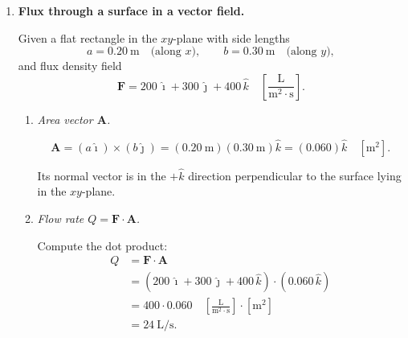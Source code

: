 \documentclass[12pt]{article}
\begin{document}
\begin{enumerate}
\begin{enumerate}
    \item \textit{Projection of $\mathbf{a}$ onto $\mathbf{v}$. Physical meaning.}

    The projection of $\mathbf{a}$ onto $\mathbf{v}$ is the component of acceleration along the direction of motion. It measures tangential acceleration (change in speed). Compute
    \[
      \text{proj}_{\mathbf{v}}\mathbf{a}
      = \frac{\mathbf{a}\cdot \mathbf{v}}{\|\mathbf{v}\|^2} \,\mathbf{v}.
    \]

    First compute the dot product:
    \begin{align*}
      \mathbf{a}(t)\cdot \mathbf{v}(t)
      &= (-a\cos t)(-a\sin t) + (-a\sin t)(a\cos t) + (0)(c) \\
      &= a^2 \cos t \sin t - a^2 \sin t \cos t \\
      &= 0.
    \end{align*}

    Therefore
    \[
      \text{proj}_{\mathbf{v}}\mathbf{a} = \mathbf{0}.
    \]

    Interpretation: there is no acceleration component along the velocity direction, so the speed is constant. The acceleration is purely normal (centripetal), changing only the direction of the velocity, not its magnitude.
\end{enumerate}


\item \textbf{Flux through a surface in a vector field.}

Given a flat rectangle in the $xy$-plane with side lengths
\[
a = 0.20~\mathrm{m} \quad \text{(along $x$)}, \qquad
b = 0.30~\mathrm{m} \quad \text{(along $y$)},
\]
and flux density field
\[
\mathbf{F} = 200\,\hat{\imath} + 300\,\hat{\jmath} + 400\,\hat{k}
\quad
\left[\frac{\mathrm{L}}{\mathrm{m}^2\cdot \mathrm{s}}\right].
\]

\begin{enumerate}
    \item \textit{Area vector $\mathbf{A}$.}


    \[
      \mathbf{A} = (a\hat{\imath})\times(b\hat{\jmath}) = (0.20~\mathrm{m})(0.30~\mathrm{m})\hat{k} = (0.060)\hat{k} \quad [\mathrm{m}^2].
    \]

    Its normal vector is in the $+\hat{k}$ direction perpendicular to the surface lying in the $xy$-plane.
    
    \item \textit{Flow rate $Q = \mathbf{F} \cdot \mathbf{A}$.}

    Compute the dot product:
    \begin{align*}
      Q &= \mathbf{F} \cdot \mathbf{A} \\
        &= (200\,\hat{\imath} + 300\,\hat{\jmath} + 400\,\hat{k}) \cdot (0.060\,\hat{k}) \\
        &= 400 \cdot 0.060 \quad \left[\frac{\mathrm{L}}{\mathrm{m}^2\cdot \mathrm{s}}\right] \cdot [\mathrm{m}^2] \\
        &= 24~\mathrm{L/s}.
    \end{align*}


\end{enumerate}
\end{enumerate}
\end{document}
